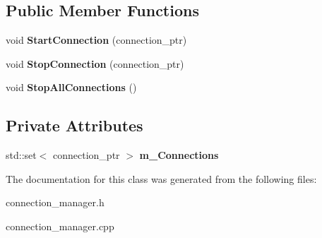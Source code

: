 \subsection*{\-Public \-Member \-Functions}
\begin{DoxyCompactItemize}
\item 
\hypertarget{classhttp__server_1_1cConnectionManager_ab7741005e29b740894addaded7a17ee2}{void {\bfseries \-Start\-Connection} (connection\-\_\-ptr)}\label{classhttp__server_1_1cConnectionManager_ab7741005e29b740894addaded7a17ee2}

\item 
\hypertarget{classhttp__server_1_1cConnectionManager_a740f1202cf4db1493aac3c8f0a99bbb4}{void {\bfseries \-Stop\-Connection} (connection\-\_\-ptr)}\label{classhttp__server_1_1cConnectionManager_a740f1202cf4db1493aac3c8f0a99bbb4}

\item 
\hypertarget{classhttp__server_1_1cConnectionManager_a5dddb041d33c7bbb4220deaa9dd74b3c}{void {\bfseries \-Stop\-All\-Connections} ()}\label{classhttp__server_1_1cConnectionManager_a5dddb041d33c7bbb4220deaa9dd74b3c}

\end{DoxyCompactItemize}
\subsection*{\-Private \-Attributes}
\begin{DoxyCompactItemize}
\item 
\hypertarget{classhttp__server_1_1cConnectionManager_a6bc3632311d979511b8393d611b88752}{std\-::set$<$ connection\-\_\-ptr $>$ {\bfseries m\-\_\-\-Connections}}\label{classhttp__server_1_1cConnectionManager_a6bc3632311d979511b8393d611b88752}

\end{DoxyCompactItemize}


\-The documentation for this class was generated from the following files\-:\begin{DoxyCompactItemize}
\item 
connection\-\_\-manager.\-h\item 
connection\-\_\-manager.\-cpp\end{DoxyCompactItemize}
